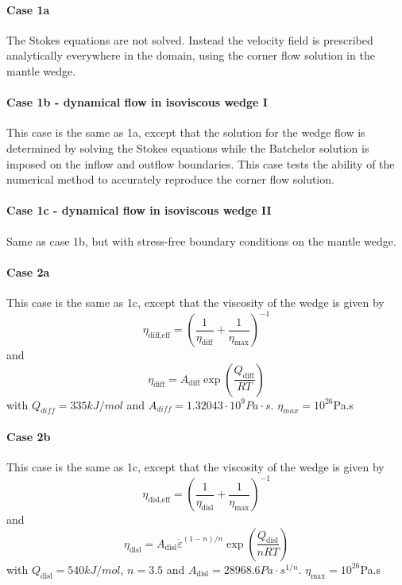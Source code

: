\paragraph{Case 1a} The Stokes equations are not solved. Instead the velocity field
is prescribed analytically everywhere in the domain, using the corner flow solution 
in the mantle wedge. 

\paragraph{Case 1b - dynamical flow in isoviscous wedge I}
This case is the same as 1a, except that the solution
for the wedge flow is determined by solving the Stokes equations while the Batchelor solution is
imposed on the inflow and outflow boundaries. This case tests the ability of the numerical method
to accurately reproduce the corner flow solution.

\paragraph{Case 1c - dynamical flow in isoviscous wedge II} 
Same as case 1b, but with stress-free boundary conditions on the mantle wedge.

\paragraph{Case 2a}

This case is the same as 1c, except that the viscosity of the wedge
is given by 
\[
\eta_{\text{diff,eff}} = \left( \frac{1}{\eta_{\text{diff}}} + \frac{1}{\eta_{\text{max}}} \right)^{-1}
\]
and
\[
\eta_{\text{diff}}=A_{\text{diff}} \exp\left( \frac{Q_{\text{diff}}}{RT} \right)
\]
with
$Q_{diff}=335kJ/mol$ and $A_{diff}=1.32043 \cdot 10^9Pa\cdot s$. $\eta_{max}=10^{26}$Pa.s

\paragraph{Case 2b}

This case is the same as 1c, except that the viscosity of the wedge
is given by 
\[
\eta_{\text{disl,eff}} = \left( \frac{1}{\eta_{\text{disl}}} + \frac{1}{\eta_{\text{max}}} \right)^{-1}
\]
and
\[
\eta_{\text{disl}}=
A_{\text{disl}} \dot\varepsilon^{(1-n)/n} \exp \left( \frac{Q_{\text{disl}}}{nRT} \right)
\]
with $Q_{\text{disl}}=540kJ/mol$, $n=3.5$ and $A_{\text{disl}}=28968.6Pa\cdot s^{1/n}$. 
$\eta_{\text{max}}=10^{26}$Pa.s



